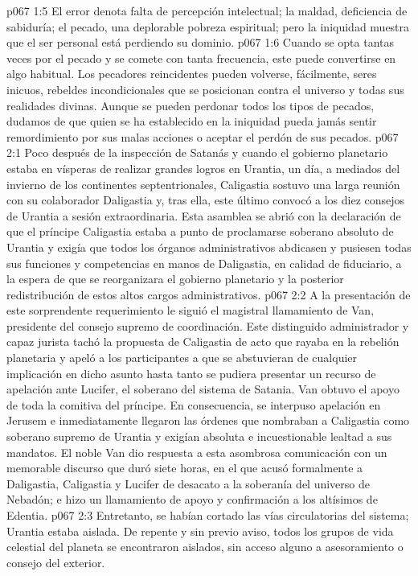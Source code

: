 \vs p067 1:5 El error denota falta de percepción intelectual; la maldad, deficiencia de sabiduría; el pecado, una deplorable pobreza espiritual; pero la iniquidad muestra que el ser personal está perdiendo su dominio.
\vs p067 1:6 Cuando se opta tantas veces por el pecado y se comete con tanta frecuencia, este puede convertirse en algo habitual. Los pecadores reincidentes pueden volverse, fácilmente, seres inicuos, rebeldes incondicionales que se posicionan contra el universo y todas sus realidades divinas. Aunque se pueden perdonar todos los tipos de pecados, dudamos de que quien se ha establecido en la iniquidad pueda jamás sentir remordimiento por sus malas acciones o aceptar el perdón de sus pecados.
\vs p067 2:1 Poco después de la inspección de Satanás y cuando el gobierno planetario estaba en vísperas de realizar grandes logros en Urantia, un día, a mediados del invierno de los continentes septentrionales, Caligastia sostuvo una larga reunión con su colaborador Daligastia y, tras ella, este último convocó a los diez consejos de Urantia a sesión extraordinaria. Esta asamblea se abrió con la declaración de que el príncipe Caligastia estaba a punto de proclamarse soberano absoluto de Urantia y exigía que todos los órganos administrativos abdicasen y pusiesen todas sus funciones y competencias en manos de Daligastia, en calidad de fiduciario, a la espera de que se reorganizara el gobierno planetario y la posterior redistribución de estos altos cargos administrativos.
\vs p067 2:2 A la presentación de este sorprendente requerimiento le siguió el magistral llamamiento de Van, presidente del consejo supremo de coordinación. Este distinguido administrador y capaz jurista tachó la propuesta de Caligastia de acto que rayaba en la rebelión planetaria y apeló a los participantes a que se abstuvieran de cualquier implicación en dicho asunto hasta tanto se pudiera presentar un recurso de apelación ante Lucifer, el soberano del sistema de Satania. Van obtuvo el apoyo de toda la comitiva del príncipe. En consecuencia, se interpuso apelación en Jerusem e inmediatamente llegaron las órdenes que nombraban a Caligastia como soberano supremo de Urantia y exigían absoluta e incuestionable lealtad a sus mandatos. El noble Van dio respuesta a esta asombrosa comunicación con un memorable discurso que duró siete horas, en el que acusó formalmente a Daligastia, Caligastia y Lucifer de desacato a la soberanía del universo de Nebadón; e hizo un llamamiento de apoyo y confirmación a los altísimos de Edentia.
\vs p067 2:3 \pc Entretanto, se habían cortado las vías circulatorias del sistema; Urantia estaba aislada. De repente y sin previo aviso, todos los grupos de vida celestial del planeta se encontraron aislados, sin acceso alguno a asesoramiento o consejo del exterior.

